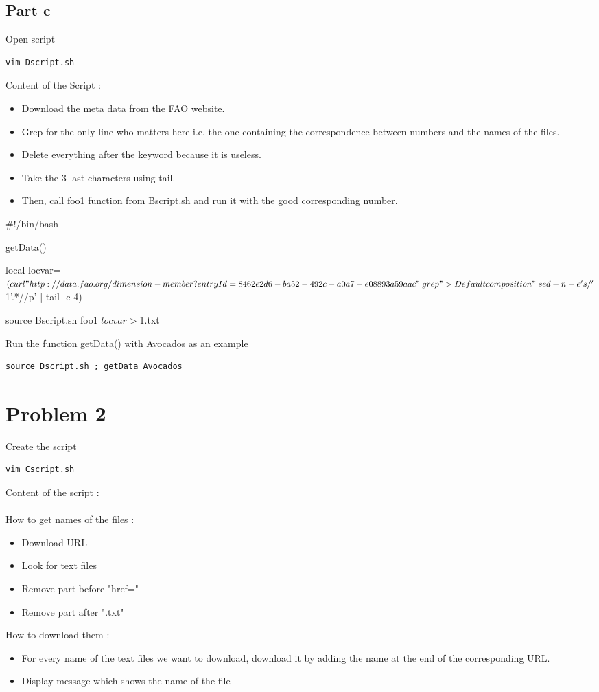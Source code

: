 \documentclass{llncs}\usepackage[]{graphicx}\usepackage[]{color}
\begin{document}
\subsection{Part c}
Open script
\begin{lstlisting}[frame=single] 
vim Dscript.sh
\end{lstlisting}
Content of the Script :
\begin{itemize}
\item Download the meta data from the FAO website.
\item Grep for the only line who matters here i.e. the one containing the correspondence between numbers and the names of the files.
\item Delete everything after the keyword because it is useless.
\item Take the 3 last characters using tail.
\item Then, call foo1 function from Bscript.sh and run it with the good corresponding number.
\end{itemize}
\begin{boxedverbatim}
#!/bin/bash

getData(){


local locvar=$(curl "http://data.fao.org/dimension-member?
entryId=8462e2d6-ba52-492c-a0a7-e08893a59aac" | grep ">Def
ault composition" | sed -n -e 's/ '$1'.*//p' | tail -c 
4)

source Bscript.sh
foo1 $locvar > $1.txt
}
\end{boxedverbatim}

Run the function getData() with Avocados as an example
\begin{lstlisting}[frame=single]
source Dscript.sh ; getData Avocados
\end{lstlisting}
\section{Problem 2}
Create the script
\begin{lstlisting}[frame=single] 
vim Cscript.sh
\end{lstlisting}
Content of the script :\\\\
How to get names of the files :
\begin{itemize}
\item Download URL 
\item Look for text files
\item Remove part before "href="
\item Remove part after ".txt"
\end{itemize}
How to download them :
\begin{itemize}
\item For every name of the text files we want to download, download it by adding the name at the end of the corresponding URL.
\item Display message which shows the name of the file
\end{itemize}
\end{document}
